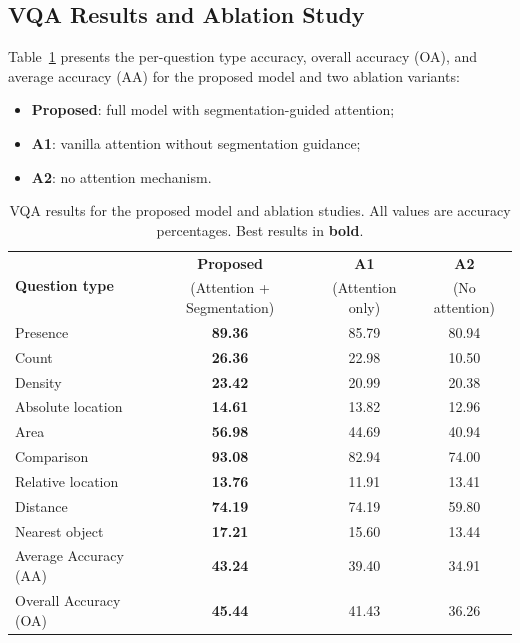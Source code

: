 \subsection{VQA Results and Ablation Study}
\label{sec:chap4_vqa_results}

Table~\ref{tab:chap4_results} presents the per-question
type accuracy, overall accuracy (OA), and average accuracy
(AA) for the proposed model and two ablation variants:

\begin{itemize}
    \item \textbf{Proposed}: full model with
    segmentation-guided attention;
    \item \textbf{A1}: vanilla attention without
    segmentation guidance;
    \item \textbf{A2}: no attention mechanism.
\end{itemize}

\begin{table}[ht]
\centering
\small
\begin{tabular}{l ccc}
\toprule
\multirow{2}{*}{\textbf{Question type}}
  & \textbf{Proposed} & \textbf{A1} & \textbf{A2} \\
  & (Attention + Segmentation) & (Attention only) & (No attention) \\
\midrule
Presence & \textbf{89.36} & 85.79 & 80.94 \\
Count & \textbf{26.36} & 22.98 & 10.50 \\
Density & \textbf{23.42} & 20.99 & 20.38 \\
Absolute location & \textbf{14.61} & 13.82 & 12.96 \\
Area & \textbf{56.98} & 44.69 & 40.94 \\
Comparison & \textbf{93.08} & 82.94 & 74.00 \\
Relative location & \textbf{13.76} & 11.91 & 13.41 \\
Distance & \textbf{74.19} & 74.19 & 59.80 \\
Nearest object & \textbf{17.21} & 15.60 & 13.44 \\
\midrule
Average Accuracy (AA) & \textbf{43.24} & 39.40 & 34.91 \\
Overall Accuracy (OA) & \textbf{45.44} & 41.43 & 36.26 \\
\bottomrule
\end{tabular}
\caption{VQA results for the proposed model and ablation
studies. All values are accuracy percentages.
Best results in \textbf{bold}.}
\label{tab:chap4_results}
\end{table}

